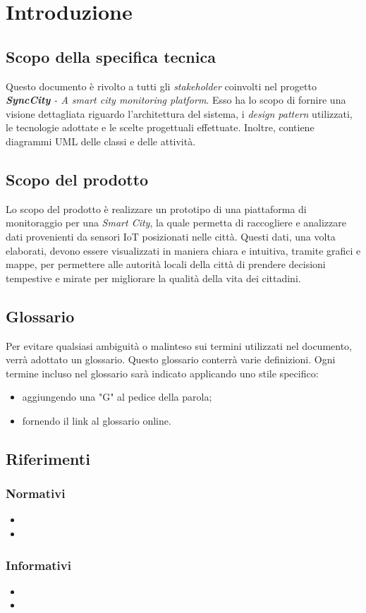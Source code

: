 \section{Introduzione}
\setcounter{subsection}{0}
\subsection{Scopo della specifica tecnica}
Questo documento è rivolto a tutti gli \textit{stakeholder} coinvolti nel progetto \textit{\textbf{SyncCity} - A smart city monitoring platform}.
Esso ha lo scopo di fornire una visione dettagliata riguardo l'architettura del sistema, i \textit{design pattern} utilizzati, le tecnologie adottate e le scelte progettuali effettuate.
Inoltre, contiene diagrammi UML delle classi e delle attività.

\subsection{Scopo del prodotto}
Lo scopo del prodotto è realizzare un prototipo di una piattaforma di monitoraggio per una \textit{Smart City}, la quale permetta di raccogliere e analizzare dati provenienti da sensori IoT posizionati nelle città.
Questi dati, una volta elaborati, devono essere visualizzati in maniera chiara e intuitiva, tramite grafici e mappe, per permettere alle autorità locali della città di prendere decisioni
tempestive e mirate per migliorare la qualità della vita dei cittadini.

\subsection{Glossario}
Per evitare qualsiasi ambiguità o malinteso sui termini utilizzati nel documento, verrà adottato un glossario. Questo glossario conterrà varie definizioni. Ogni termine incluso nel glossario sarà indicato applicando uno stile specifico:
\begin{itemize}
	\item aggiungendo una "G" al pedice della parola;
	\item fornendo il link al glossario online.
\end{itemize}

\subsection{Riferimenti}
\subsubsection{Normativi} %
\begin{itemize}
	\item
	\item
\end{itemize}
\subsubsection{Informativi}
\begin{itemize} %
	\item
	\item
\end{itemize}
